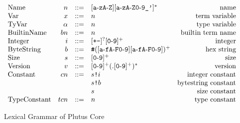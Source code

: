\documentclass[../main.tex]{subfiles}
\begin{document}
\begin{figure*}[t]
    \centering
    \[\begin{array}{lrclr}
        
        \textrm{Name}        & n      & ::= & [\texttt{a}\!\hyphen{}\!\texttt{z}\texttt{A}\!\hyphen{}\!\texttt{Z}][\texttt{a}\!\hyphen{}\!\texttt{zA}\!\hyphen{}\!\texttt{Z0}\!\hyphen{}\!\texttt{9\_'}]^*   & \textrm{name}\\
        
        \textrm{Var}           & x      & ::= & n & \textrm{term variable}\\
        \textrm{TyVar}         & \alpha & ::= & n & \textrm{type variable}\\
        \textrm{BuiltinName}   & bn     & ::= & n & \textrm{builtin term name}\\
        \textrm{Integer} & i  & ::= & [\texttt{+-}]^?[\texttt{0}\!\hyphen{}\!\texttt{9}]^+ & \textrm{integer}\\
        
        \textrm{ByteString}   & b  & ::= & \texttt{\#}([\texttt{a}\!\hyphen{}\!\texttt{fA}\!\hyphen{}\!\texttt{F0}\!\hyphen{}\!\texttt{9}][\texttt{a}\!\hyphen{}\!\texttt{fA}\!\hyphen{}\!\texttt{F0}\!\hyphen{}\!\texttt{9}])^+ & \textrm{hex string}\\
        
        \textrm{Size} & s  & ::= & [\texttt{0}\!\hyphen{}\!\texttt{9}]^+ & \textrm{size}\\
        
        \textrm{Version} & v & ::= & [\texttt{0}\!\hyphen{}\!\texttt{9}]^+(.[\texttt{0}\!\hyphen{}\!\texttt{9}]^+)^* & \textrm{version}\\
        
        \textrm{Constant} & cn & ::= & \sizedBuiltin{s}{i} & \textrm{integer constant}\\
                          &    &     & \sizedBuiltin{s}{b} & \textrm{bytestring constant}\\
                          &    &     & s & \textrm{size constant}\\
        \textrm{TypeConstant} & tcn    & ::= & n & \textrm{type constant}\\
        
        
    \end{array}\]
    \caption{Lexical Grammar of Plutus Core}
    \label{fig:Plutus_core_lexical_grammar}
\end{figure*}
\end{document}
